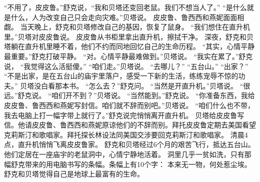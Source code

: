 \documentclass[a4paper,12pt,UTF8,twoside]{ctexbook}
\begin{document}
        “不用了，皮皮鲁。”舒克说，“我和贝塔还变回老鼠。我们不想当人了。”  
        “是什么就是什么，人为改变自己只会走向灾难。”贝塔说。  
        皮皮鲁、鲁西西和燕妮面面相觑。  
        当天晚上，舒克和贝塔修改自己的基因，恢复了鼠身。  
        “我们想住在直升机里。”贝塔对皮皮鲁说。  
        皮皮鲁从书柜里拿出直升机，擦拭干净。  
        深夜，舒克和贝塔躺在直升机里睡不着，他们不约而同地回忆自己的生命历程。  
        “其实，心情平静最重要。”舒克打破平静。  
        “对。心情平静最难做到。”贝塔说。  
        “我实在累了。”舒克说，  “我觉得这么活挺傻。”  
        “咱们走。”贝塔说。  
        “去哪儿？”  
        “五台山。”  
        “出家？”  
        “不是出家，是在五台山的庙宇里落户，感受一下新的生活，练练宠辱不惊的功夫。”  
        贝塔没白看那本书。  
        “怎么去？”舒克问。  
        “当然是开直升机。”贝塔说。  
        “很远。”舒克说。  
        “咱们开不到？”贝塔说。  
        “当然能到。”舒克说。  
        “你准备东西，我给皮皮鲁、鲁西西和燕妮写封信。咱们就不辞而别吧。”贝塔说。  
        “咱们什么也不带，我去电脑上打一幅字带上就行了。”舒克说完悄悄离开直升机。  
        贝塔给皮皮鲁写信。他请皮皮鲁、鲁西西和燕妮原谅他们的不辞而别。拜托皮皮鲁定期去美国看望克莉斯汀和歌唱家。拜托探长林设法同美国交涉要回克莉斯汀和歌唱家。  
        清晨4点，直升机悄悄飞离皮皮鲁家。  
        舒克和贝塔经过6个月的艰苦飞行，抵达五台山。        
        他们定居在一座庙宇的老鼠洞中，心情宁静地活着。  
        洞里几乎一贫如洗，只有那幅舒克带来的用电脑书写的条幅。条幅上有10个字：  
        本来无一物，何处惹尘埃。  
        舒克和贝塔觉得自己是地球上最富有的生命。 

\backmatter
      
\end{document}
